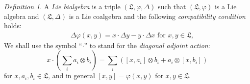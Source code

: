 \documentclass{amsart}
\theoremstyle{definition}
\theoremstyle{remark}
\numberwithin{equation}{subsection}
\numberwithin{equation}{section}
\newtheorem{defi}[theo]{Definition}
\begin{document}
\begin{defi}
\label{def1} \rm A {\it Lie bialgebra} is a triple $(\mathfrak{L}
,{\varphi}, {\Delta} )$ such that $(\mathfrak{L} ,{\varphi})$ is a Lie algebra and
$(\mathfrak{L} ,{\Delta})$ is a Lie coalgebra and the following {\it
compatibility condition} holds:
\begin{eqnarray}
\label{bLie-d} \!\!\!\!\!\!\!\!\!\!\!\!&& \mbox{${\Delta}  {\varphi} (x, y) = x
\cdot {\Delta} y - y \cdot {\Delta} x$ \ \ \ for \ \ $x, y \in \mathfrak{L} $, }
\end{eqnarray}
We shall use the symbol ``$\cdot$'' to stand for the {\it diagonal
adjoint action}:
\begin{equation}
\label{diag} x\cdot (\mbox{$\sum\limits_{i}$} {a_{i} \otimes b_{i}})
= \mbox{$\sum\limits_{i}$} ( {[x, a_{i}] \otimes b_{i} + a_{i}
\otimes [x, b_{i}]})
\end{equation}
for $x, a_{i}, b_{i} \in \mathfrak{L} $, and in general
$[x,y]={\varphi}(x,y)$ for $x,y \in \mathfrak{L} $.
\end{defi}
\end{document}
